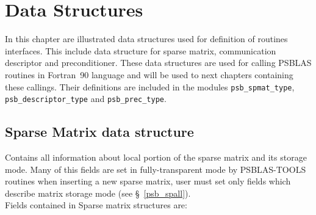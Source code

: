 \section{Data Structures}
\label{sec:datastruct}

In this chapter are illustrated data structures used for definition of
routines interfaces. This include data structure for sparse matrix,
communication descriptor and preconditioner. These data structures are used for
calling PSBLAS routines in Fortran~90 language and will be used to next
chapters containing these callings. Their definitions are included in
the modules \verb|psb_spmat_type|, \verb|psb_descriptor_type| and \verb|psb_prec_type|. 

\subsection{Sparse Matrix data structure}
\label{sec:spmat}
Contains all information about local portion of the sparse matrix and
its storage mode. Many of this fields are set in fully-transparent
mode by PSBLAS-TOOLS routines when inserting a new sparse matrix, user
must set only fields which describe matrix storage mode (see
\S~\ref{psb_spall}). \\
Fields contained in Sparse matrix structures are:
